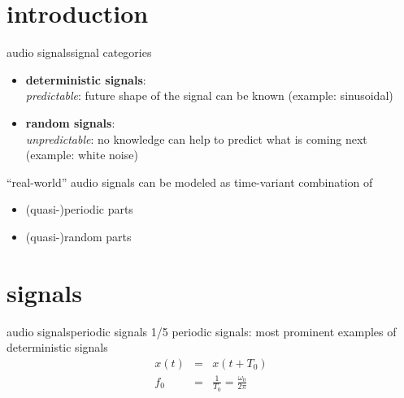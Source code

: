     \section[intro]{introduction}
        \begin{frame}{audio signals}{signal categories}
            \begin{itemize}
                \item	\textbf{deterministic signals}:\\
                        \textit{predictable}: future shape of the signal can be known (example: sinusoidal)
                \pause		
                \item	\textbf{random signals}:\\
                        \textit{unpredictable}: no knowledge can help to predict what is coming next (example: white noise)
            \end{itemize}
            
            \bigskip
            \pause
            ``real-world'' audio signals can be modeled as time-variant combination of 
            \begin{itemize}
                \item	(quasi-)periodic parts
                \item	(quasi-)random parts
            \end{itemize}
        \end{frame}

    \section[signals]{signals}
        \begin{frame}{audio signals}{periodic signals 1/5}
            \vspace{-2mm}
            periodic signals: most prominent examples of deterministic signals
            \begin{eqnarray*}
                x(t) 	&=& x(t+T_0)\\
                f_0 	&=& \frac{1}{T_0} =  \frac{\omega_0}{2\pi}
            \end{eqnarray*}

            \vspace{-4mm}
        \end{frame}

